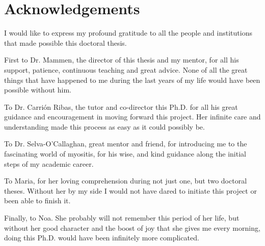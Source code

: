 \chapter*{Acknowledgements}
\thispagestyle{empty}
I would like to express my profound gratitude to all the people and institutions that made possible this doctoral thesis.

First to Dr. Mammen, the director of this thesis and my mentor, for all his support, patience, continuous teaching and great advice. None of all the great things that have happened to me during the last years of my life would have been possible without him.

To Dr. Carrión Ribas, the tutor and co-director this Ph.D. for all his great guidance and encouragement in moving forward this project. Her infinite care and understanding made this process as easy as it could possibly be.

To Dr. Selva-O'Callaghan, great mentor and friend, for introducing me to the fascinating world of myositis, for his wise, and kind guidance along the initial steps of my academic career.

To Maria, for her loving comprehension during not just one, but two doctoral theses. Without her by my side I would not have dared to initiate this project or been able to finish it.

Finally, to Noa. She probably will not remember this period of her life, but without her good character and the boost of joy that she gives me every morning, doing this Ph.D. would have been infinitely more complicated.
